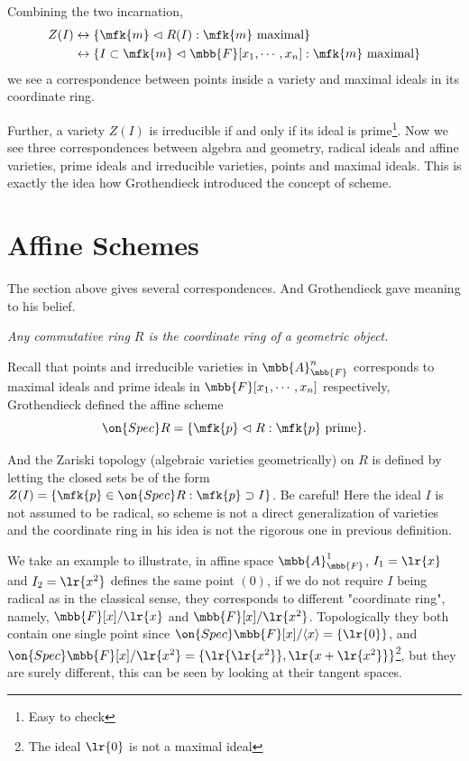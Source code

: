\documentclass[12pt]{article}
\begin{document}
Combining the two incarnation,
\begin{align*}
Z(I)&\leftrightarrow\{\mfk{m}\vartriangleleft R(I):\mfk{m}~\text{maximal}\}\\
&\leftrightarrow\{I\subset\mfk{m}\vartriangleleft\mbb{F}[x_1,\cdots,x_n]:\mfk{m}~\text{maximal}\}
\end{align*}
we see a correspondence between points inside a variety and maximal ideals in its coordinate ring.

Further, a variety $Z(I)$ is irreducible if and only if its ideal is prime\footnote{Easy to check}. Now we see three correspondences between algebra and geometry, radical ideals and affine varieties, prime ideals and irreducible varieties, points and maximal ideals. This is exactly the idea how Grothendieck introduced the concept of scheme.

\section{Affine Schemes}\label{affinescheme}
The section above gives several correspondences. And Grothendieck gave meaning to his belief.

\bigskip
\textit{Any commutative ring $R$ is the coordinate ring of a geometric object.}
\bigskip

Recall that points and irreducible varieties in $\mbb{A}_{\mbb{F}}^n$ corresponds to maximal ideals and prime ideals in $\mbb{F}[x_1,\cdots,x_n]$ respectively, Grothendieck defined the affine scheme
$$
\on{Spec}R=\{\mfk{p}\vartriangleleft R:\mfk{p}~\text{prime}\}.
$$

And the Zariski topology (algebraic varieties geometrically) on $R$ is defined by letting the closed sets be of the form $Z(I)=\{\mfk{p}\in\on{Spec}R:\mfk{p}\supset I\}$. Be careful! Here the ideal $I$ is not assumed to be radical, so scheme is not a direct generalization of varieties and the coordinate ring in his idea is not the rigorous one in previous definition.

We take an example to illustrate, in affine space $\mbb{A}_{\mbb{F}}^1$, $I_1=\lr{x}$ and $I_2=\lr{x^2}$ defines the same point $(0)$, if we do not require $I$ being radical as in the classical sense, they corresponds to different "coordinate ring", namely, $\mbb{F}[x]/\lr{x}$ and $\mbb{F}[x]/\lr{x^2}$. Topologically they both contain one single point since $\on{Spec}\mbb{F}[x]/\langle x\rangle=\{\lr{0}\}$, and $\on{Spec}\mbb{F}[x]/\lr{x^2}=\{\lr{\lr{x^2}},\lr{x+\lr{x^2}}\}$\footnote{The ideal $\lr{0}$ is not a maximal ideal}, but they are surely different, this can be seen by looking at their tangent spaces.
 
\end{document}
